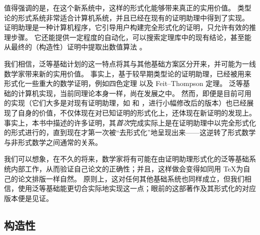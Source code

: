 值得强调的是，在这个新系统中，这样的形式化能够带来真正的实用价值。
类型论的形式系统非常适合计算机系统，并且已经在现有的证明助理中得到了实现。
%
证明助理是一种计算机程序，它引导用户构建完全形式化的证明，只允许有效的推理步骤。
它还能提供一定程度的自动化，可以搜索定理库中的现有结论，甚至能从最终的（构造性）证明中提取出数值算法 。

我们相信，泛等基础计划的这一特点将其与其他基础方案区分开来，并可能为一线数学家带来新的实用价值。
事实上，基于较早期类型论的证明助理，已经被用来形式化一些重大的数学证明，例如四色定理 以及 Feit--Thompson 定理。
泛等基础的计算机实现，当前同理论本身一样，尚在发展之中。
%
然而，即便是目前可用的实现（它们大多是对现有证明助理，如 \Coq 和 \Agda，进行小幅修改后的版本）也已经展现了自身的价值，不仅体现在对已知证明的形式化上，还体现在新证明的发现上。
事实上，本书中描述的许多证明，其\emph{首次}完成实际上是在证明助理中以完全形式化的形式进行的，直到现在才第一次被``去形式化''地呈现出来——这逆转了形式数学与非形式数学之间通常的关系。

我们可以想象，在不久的将来，数学家将有可能在由证明助理形式化的泛等基础系统内部工作，从而验证自己论文的正确性；并且，这样做会变得如同用 \TeX 为自己的论文排版一样自然。
原则上，这对任何其他基础系统也同样成立，但我们相信，使用泛等基础能更切合实际地实现这一点；眼前的这部著作及其形式化的对应版本便是见证。

%
%
%
%

\subsection*{构造性}

%

